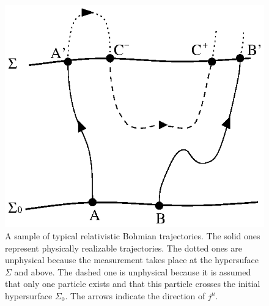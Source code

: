 \documentclass[12pt]{article}
\begin{document}
\begin{figure}[t]
\centerline{\includegraphics{traj2.ps}}
\caption{A sample of typical relativistic Bohmian trajectories.
The solid ones represent physically realizable trajectories. 
The dotted ones are unphysical because the measurement takes place 
at the hypersuface $\Sigma$ and above. The dashed one is unphysical 
because it is assumed that only one particle exists and that 
this particle crosses the initial hypersurface $\Sigma_0$.
The arrows indicate the direction of $j^{\mu}$.}
\label{fig1}
\end{figure}
\end{document}
